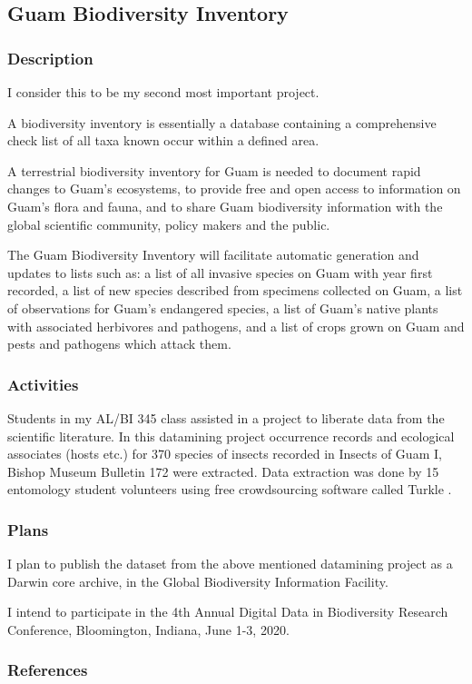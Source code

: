 \subsection{Guam Biodiversity Inventory}
\begin{refsection}
	
	\subsubsection{Description}
	
	I consider this to be my second most important project.
	
	A biodiversity inventory is essentially a database containing a comprehensive
	check list of all taxa known occur within a defined area.
	
	A terrestrial biodiversity inventory for Guam is needed to document
	rapid changes to Guam\textquoteright s ecosystems, to provide free
	and open access to information on Guam\textquoteright s flora and
	fauna, and to share Guam biodiversity information with the global
	scientific community, policy makers and the public.
	
	The Guam Biodiversity Inventory will facilitate automatic generation
	and updates to lists such as: a list of all invasive species on Guam
	with year first recorded, a list of new species described from specimens
	collected on Guam, a list of observations for Guam\textquoteright s
	endangered species, a list of Guam\textquoteright s native plants
	with associated herbivores and pathogens, and a list of crops grown
	on Guam and pests and pathogens which attack them.
	
	\subsubsection{Activities}
	
	Students in my AL/BI 345 class assisted in a project to liberate data from the scientific literature. In this datamining project occurrence records and ecological associates (hosts etc.) for 370 species of insects recorded
	in Insects of Guam I, Bishop Museum Bulletin 172 were extracted. Data extraction was done by 15 entomology student volunteers using free
	crowdsourcing software called Turkle \cite{moore_github_2019-1}. 
	
	\subsubsection{Plans}
	
	I plan to publish the dataset from the above mentioned datamining project as a Darwin core archive, in the Global Biodiversity Information Facility.
	
	I intend to participate in the 4th Annual Digital Data in Biodiversity Research Conference, Bloomington, Indiana, June 1-3, 2020.
	
	\subsubsection{References}
	\printbibliography[heading=none]
\end{refsection}

